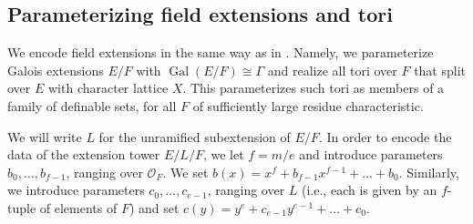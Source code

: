 \documentclass{amsart}
\newcommand{\ri}{\mathcal{O}}
\DeclareMathOperator{\Gal}{Gal}
\theoremstyle{plain}
\theoremstyle{definition}
\begin{document}
\subsection{Parameterizing field extensions and tori}\label{sub:def_tori}
 
We encode field extensions in the same way as in \cite{CGH-2}.
Namely, we parameterize Galois extensions $E/F$ with $\Gal(E/F) \cong \Gamma$
and realize all tori over $F$ that split over $E$ with character lattice $X$.
This parameterizes such tori as members of a family of definable sets,
for all $F$ of sufficiently large residue characteristic. 

We will write $L$ for the unramified subextension of $E/F$.  In order to encode the data of the extension tower $E/L/F$, we let $f=m/e$ and introduce parameters $b_0,\dots, b_{f-1}$, ranging over $\ri_F$.
We set $b(x)=x^f+b_{f-1}x^{f-1}+ \dots + b_0$. 
Similarly, we introduce parameters $c_0, \dots, c_{e-1}$, ranging over $L$
(i.e., each is given by an $f$-tuple of elements of $F$) and set $c(y) = y^e + c_{e-1}y^{e-1} + \dots + c_0$.
\end{document}
